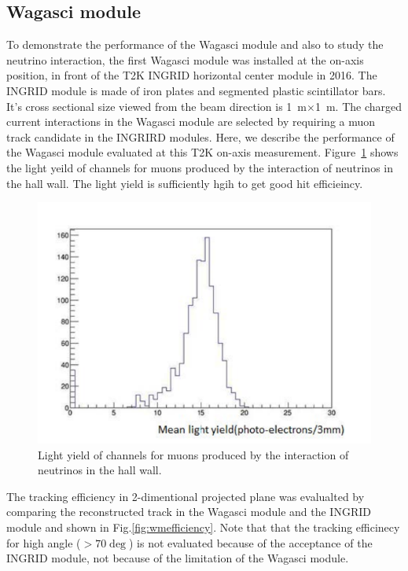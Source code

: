 \subsection{Wagasci module}
To demonstrate the performance of the Wagasci module and also to study the neutrino interaction,
the first Wagasci module was installed at the on-axis position, in front of the T2K INGRID horizontal center module
in 2016.
The INGRID module is made of iron plates and segmented plastic scintillator bars.
It's cross sectional size viewed from the beam direction is 1~m$\times$1~m.
The charged current interactions in the Wagasci module are selected by requiring a muon track candidate
in the INGRIRD modules.
Here, we describe the performance of the Wagasci module evaluated at this T2K on-axis measurement.
Figure~\ref{fig:wmlight} shows the light yeild of channels for muons produced by the interaction of neutrinos
in the hall wall.
The light yield is sufficiently hgih to get good hit efficieincy.  
\begin{figure}[tbh]
\begin{center}
\includegraphics[width=0.5\linewidth]{fig/wmlight.pdf}
\end{center}
\caption{Light yield of channels for muons produced by the interaction of neutrinos
  in the hall wall.
}
\label{fig:wmlight}
\end{figure}
The tracking efficiency in 2-dimentional projected plane was evalualted by comparing the reconstructed track
in the Wagasci module and the INGRID module and shown in Fig.\ref{fig:wmefficiency}.
Note that that the tracking efficinecy for high angle ($>70\deg$) is not evaluated because of the acceptance
of the INGRID module, not because of the limitation of the Wagasci module.
